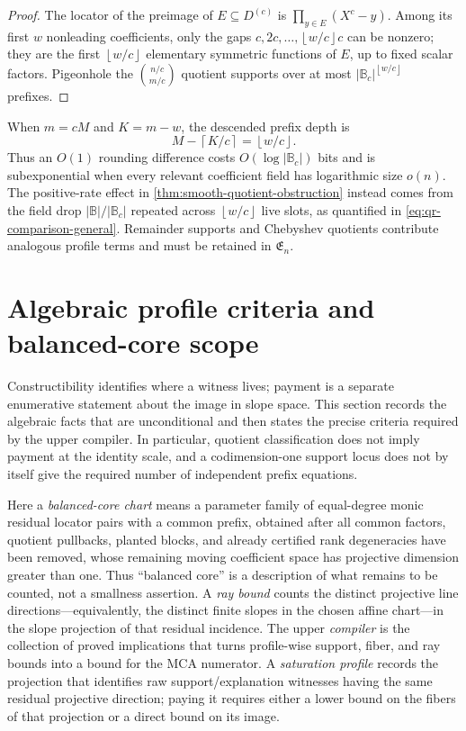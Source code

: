\documentclass[12pt,a4paper]{amsart}
\numberwithin{equation}{section}
\theoremstyle{remark}
\newcommand{\B}{\mathbb B}
\newcommand{\abs}[1]{\lvert #1\rvert}
\newcommand{\floor}[1]{\left\lfloor #1\right\rfloor}
\newcommand{\ceil}[1]{\left\lceil #1\right\rceil}
\begin{document}
\begin{proof}
The locator of the preimage of \(E\subseteq D^{(c)}\) is
\(\prod_{y\in E}(X^c-y)\).  Among its first \(w\) nonleading
coefficients, only the gaps \(c,2c,\ldots,\floor{w/c}c\) can be nonzero;
they are the first \(\floor{w/c}\) elementary symmetric functions of
\(E\), up to fixed scalar factors.  Pigeonhole the
\(\binom{n/c}{m/c}\) quotient supports over at most
\(\abs{\B_c}^{\floor{w/c}}\) prefixes.
\end{proof}

When \(m=cM\) and \(K=m-w\), the descended prefix depth is
\[
 M-\ceil{K/c}=\floor{w/c}.
 \tag{6.14}\label{eq:quotient-rounding}
\]
Thus an \(O(1)\) rounding difference costs
\(O(\log\abs{\B_c})\) bits and is subexponential when every relevant
coefficient field has logarithmic size \(o(n)\).  The positive-rate effect
in \cref{thm:smooth-quotient-obstruction} instead comes from the field
drop \(\abs\B/\abs{\B_c}\) repeated across \(\floor{w/c}\) live slots,
as quantified in \eqref{eq:qr-comparison-general}.  Remainder supports and
Chebyshev quotients contribute analogous profile terms and must be retained
in \(\mathfrak E_n\).


\section{Algebraic profile criteria and balanced-core scope}
\label{sec:ledger-closure}

Constructibility identifies where a witness lives; payment is a separate
enumerative statement about the image in slope space.  This section records
the algebraic facts that are unconditional and then states the precise
criteria required by the upper compiler.  In particular, quotient
classification does not imply payment at the identity scale, and a
codimension-one support locus does not by itself give the required number of
independent prefix equations.

Here a \emph{balanced-core chart} means a parameter family of equal-degree
monic residual locator pairs with a common prefix, obtained after all
common factors, quotient pullbacks, planted blocks, and already certified
rank degeneracies have been removed, whose remaining moving coefficient
space has projective dimension greater than one.  Thus
``balanced core'' is a description of what remains to be counted, not a
smallness assertion.  A \emph{ray bound} counts the distinct projective
line directions---equivalently, the distinct finite slopes in the chosen
affine chart---in the slope projection of that residual incidence.  The
upper \emph{compiler} is the collection of proved implications that turns
profile-wise support, fiber, and ray bounds into a bound for the MCA
numerator.  A \emph{saturation profile} records the projection that
identifies raw support/explanation witnesses having the same residual
projective direction; paying it requires either a lower bound on the fibers
of that projection or a direct bound on its image.
\end{document}
